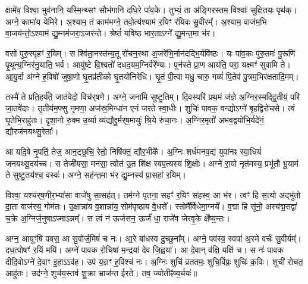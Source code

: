 क्षामे॑व॒ विश्वा॒ भुव॑नानि॒ यस्मि॒न्थ्सꣳ सौभ॑गानि दधि॒रे पा॑व॒के। तुभ्यं॒ ता अ॑ङ्गिरस्तम॒ विश्वाः᳚ सुक्षि॒तयः॒ पृथ॑क्। अग्ने॒ कामा॑य येमिरे। अ॒श्याम॒ तं काम॑मग्ने॒ तवो॒त्य॑श्याम॑ र॒यिꣳ र॑यिवः सु॒वीरम्᳚। अ॒श्याम॒ वाज॑म॒भि वा॒जय॑न्तो॒ऽश्याम॑ द्यु॒म्नम॑जरा॒ऽजर॑न्ते। श्रेष्ठं॑ यविष्ठ भार॒ताऽग्ने᳚ द्यु॒मन्त॒मा भ॑र। 

वसो॑ पुरु॒स्पृहꣳ॑ र॒यिम्। स श्वि॑ता॒नस्त॑न्य॒तू रो॑चन॒स्था अ॒जरे॑भि॒र्नान॑दद्भि॒र्यवि॑ष्ठः। यः पा॑व॒कः पु॑रु॒तमः॑ पु॒रूणि॑ पृ॒थून्य॒ग्निर॑नु॒याति॒ भर्व\snn{}। आयु॑ष्टे वि॒श्वतो॑ दधद॒यम॒ग्निर्वरे᳚ण्यः। पुन॑स्ते प्रा॒ण आय॑ति॒ परा॒ यक्ष्मꣳ॑ सुवामि ते। आ॒यु॒र्दा अ॑ग्ने ह॒विषो॑ जुषा॒णो घृ॒तप्र॑तीको घृ॒तयो॑निरेधि। घृ॒तं पी॒त्वा मधु॒ चारु॒ गव्यं॑ पि॒तेव॑ पु॒त्रम॒भिर॑क्षतादि॒मम्।

तस्मै॑ ते प्रति॒हर्य॑ते॒ जात॑वेदो॒ विच॑र्‌षणे। अग्ने॒ जना॑मि सुष्टु॒तिम्। दि॒वस्परि॑ प्रथ॒मं ज॑ज्ञे अ॒ग्निर॒स्मद्द्वि॒तीयं॒ परि॑ जा॒तवे॑दाः। तृ॒तीय॑म॒फ्सु नृ॒मणा॒ अज॑स्र॒मिन्धा॑न एनं जरते स्वा॒धीः। शुचिः॑ पावक॒ वन्द्योऽग्ने॑ बृ॒हद्विरो॑चसे। त्वं घृ॒तेभि॒राहु॑तः। दृ॒शा॒नो रु॒क्म उ॒र्व्या व्य॑द्यौद्दु॒र्मर्‌ष॒मायुः॑ श्रि॒ये रु॑चा॒नः। अ॒ग्निर॒मृतो॑ अभव॒द्वयो॑भि॒र्यदे॑नं॒ द्यौरज॑नयथ्सु॒रेताः᳚। 

आ यदि॒षे नृ॒पतिं॒ तेज॒ आन॒ट्छुचि॒ रेतो॒ निषि॑क्तं॒ द्यौर॒भीके᳚।
अ॒ग्निः शर्ध॑मनव॒द्यं युवा॑नꣴ स्वा॒धियं॑ जनयथ्सू॒दय॑च्च। स तेजी॑यसा॒ मन॑सा॒ त्वोत॑ उ॒त शि॑क्ष स्वप॒त्यस्य॑ शि॒क्षोः। अग्ने॑ रा॒यो नृत॑मस्य॒ प्रभू॑तौ भू॒याम॑ ते सुष्टु॒तय॑श्च॒ वस्वः॑। अग्ने॒ सह॑न्त॒मा भ॑र द्यु॒म्नस्य॑ प्रा॒सहा॑ र॒यिम्।

 विश्वा॒ यश्च॑र्‌ष॒णीर॒भ्या॑सा वाजे॑षु सा॒सह॑त्। 
तम॑ग्ने पृतना॒ सहꣳ॑ र॒यिꣳ स॑हस्व॒ आ भ॑र। त्वꣳ हि स॒त्यो अद्भु॑तो दा॒ता वाज॑स्य॒ गोम॑तः। उ॒क्षान्ना॑य व॒शान्ना॑य॒ सोम॑पृष्ठाय वे॒धसे᳚। स्तोमै᳚र्विधेमा॒ग्नये᳚। व॒द्मा हि सू॑नो॒ अस्य॑द्म॒सद्वा॑ च॒क्रे अ॒ग्निर्ज॒नुषाऽज्माऽन्नम्᳚। स त्वं न॑ ऊर्जसन॒ ऊर्जं॑ धा॒  राजे॑व जेरवृ॒के क्षे᳚ष्य॒न्तः।

अग्न॒ आयूꣳ॑षि पवस॒ आ सु॒वोर्ज॒मिषं॑ च नः। आ॒रे बा॑धस्व दु॒च्छुना᳚म्। अग्ने॒ पव॑स्व॒ स्वपा॑ अ॒स्मे वर्चः॑ सु॒वीर्यम्᳚। दध॒त्पोषꣳ॑ र॒यिं मयि॑।
अग्ने॑ पावक रो॒चिषा॑ म॒न्द्रया॑ देव जि॒ह्वया᳚। आ दे॒वान् व॑क्षि॒ यक्षि॑ च। स नः॑ पावक दीदि॒वोऽग्ने॑ दे॒वाꣳ इ॒हाऽऽव॑ह। उप॑ य॒ज्ञꣳ ह॒विश्च॑ नः। अ॒ग्निः शुचि॑ व्रततमः॒ शुचि॒र्विप्रः॒ शुचिः॑ क॒विः। शुची॑ रोचत॒ आहु॑तः। उद॑ग्ने॒ शुच॑य॒स्तव॑ शु॒क्रा भ्राज॑न्त ईरते। तव॒ ज्योतीꣴ॑ष्य॒र्चयः॑॥


